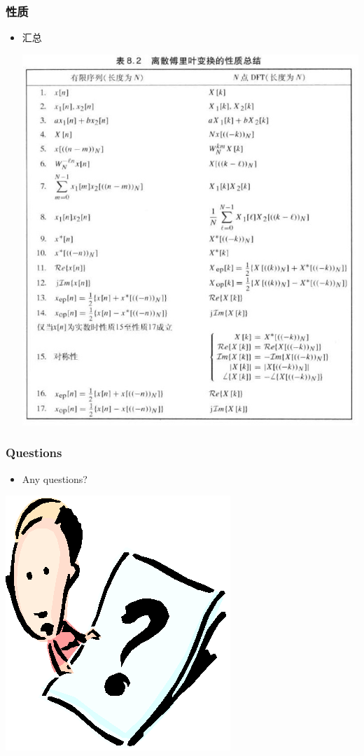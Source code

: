 \documentclass[CJKutf8,dvipsnames,table]{beamer}
\begin{document}
\begin{CJK*}{UTF8}{song}
  \begin{frame}
    \frametitle{性质}
    \begin{itemize}
    \item 汇总
  		\begin{center}
   		\includegraphics[scale=.27]{dtsp-c-t8-2}
   		\end{center}    
	\end{itemize}
  \end{frame} 
        
  \begin{frame}
    \frametitle{Questions}
    \begin{itemize}
    \item Any questions?
    \end{itemize}
    \begin{center}
      \includegraphics[scale=.5]{question}
    \end{center}
  \end{frame}  
        

\end{CJK*}
\end{document}
